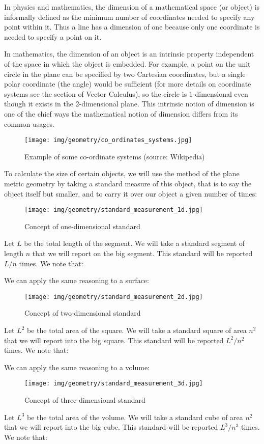 {\centering

}

In physics and mathematics, the dimension of a mathematical space (or object) is informally defined as the minimum number of coordinates needed to specify any point within it. Thus a line has a dimension of one because only one coordinate is needed to specify a point on it. 

	In mathematics, the dimension of an object is an intrinsic property independent of the space in which the object is embedded. For example, a point on the unit circle in the plane can be specified by two Cartesian coordinates, but a single polar coordinate (the angle) would be sufficient (for more details on coordinate systems see the section of Vector Calculus), so the circle is 1-dimensional even though it exists in the 2-dimensional plane. This intrinsic notion of dimension is one of the chief ways the mathematical notion of dimension differs from its common usages.

	\begin{figure}[H]
		\centering
		\texttt{[image: img/geometry/co\_ordinates\_systems.jpg]}
		\caption{Example of some co-ordinate systems (source: Wikipedia)}
	\end{figure}

	To calculate the size of certain objects, we will use the method of the plane metric geometry by taking a standard measure of this object, that is to say the object itself but smaller, and to carry it over our object a given number of times:
	\begin{figure}[H]
		\centering
		\texttt{[image: img/geometry/standard\_measurement\_1d.jpg]}
		\caption{Concept of one-dimensional standard}
	\end{figure}
	Let $L$ be the total length of the segment. We will take a standard segment of length $n$ that we will report on the big segment. This standard will be reported $L / n$ times. We note that:
	
	We can apply the same reasoning to a surface:
	\begin{figure}[H]
		\centering
		\texttt{[image: img/geometry/standard\_measurement\_2d.jpg]}
		\caption{Concept of two-dimensional standard}
	\end{figure}
	Let $L^2$ be the total area of the square. We will take a standard square of area $n^2$ that we will report into the big square. This standard will be reported $L^2 / n^2$ times. We note that:
	
	We can apply the same reasoning to a volume:
	\begin{figure}[H]
		\centering
		\texttt{[image: img/geometry/standard\_measurement\_3d.jpg]}
		\caption{Concept of three-dimensional standard}
	\end{figure}
	Let $L^3$ be the total area of the volume. We will take a standard cube of area $n^2$ that we will report into the big cube. This standard will be reported $L^3 / n^3$ times. We note that:
	
